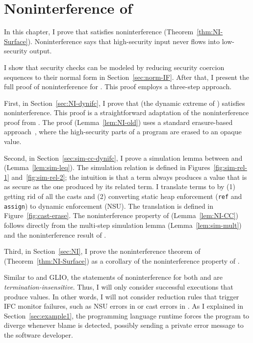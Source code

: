 \chapter{Noninterference of \Surface}
\label{ch:noninterference}

{\color{NavyBlue} %


In this chapter, I prove that \Surface satisfies noninterference
(Theorem~\ref{thm:NI-Surface}). Noninterference says that high-security input
never flows into low-security output.

I show that security checks can be modeled by reducing security coercion
sequences to their normal form in Section~\ref{sec:norm-IF}. After that, I
present the full proof of noninterference for \Surface. This proof employs a
three-step approach.

First, in Section~\ref{sec:NI-dynifc}, I prove that \DynIFC (the dynamic extreme
of \Surface) satisfies noninterference. This proof is a straightforward
adaptation of the noninterference proof from \textcite{Chen:2022aa}. The proof
(Lemma~\ref{lem:NI-old}) uses a standard erasure-based
approach~\parencite{LI20101974, stefan2011flexible, stefan2012flexible,
  Fennell:2013ab, STEFAN:2017ta}, where the high-security parts of a program are
erased to an opaque value.

Second, in Section~\ref{sec:sim-cc-dynifc}, I prove a simulation lemma between
\CC and \DynIFC (Lemma~\ref{lem:sim-leq}). The simulation relation is defined in
Figures~\ref{fig:sim-rel-1} and~\ref{fig:sim-rel-2}; the intuition is that a \CC
term always produces a value that is as secure as the one produced by its
related \DynIFC term. I translate \CC terms to \DynIFC by (1) getting rid of all
the casts and (2) converting static heap enforcement (\texttt{ref} and
\texttt{assign}) to dynamic enforcement (NSU). The translation is defined in
Figure~\ref{fig:cast-erase}. The noninterference property of \CC
(Lemma~\ref{lem:NI-CC}) follows directly from the multi-step simulation lemma
(Lemma~\ref{lem:sim-mult}) and the noninterference result of \DynIFC.

Third, in Section~\ref{sec:NI}, I prove the noninterference theorem of \Surface
(Theorem~\ref{thm:NI-Surface}) as a corollary of the noninterference property of
\CC.

} %

Similar to \GSLRef and GLIO, the statements of noninterference for both \DynIFC
and \CC are \textit{termination-insensitive}. Thus, I will only consider
successful executions that produce values. In other words, I will not consider
reduction rules that trigger IFC monitor failures, such as NSU errors in \DynIFC
or cast errors in \CC. As I explained in Section~\ref{sec:example1}, the
programming language runtime forces the program to diverge whenever blame is
detected, possibly sending a private error message to the software developer.

